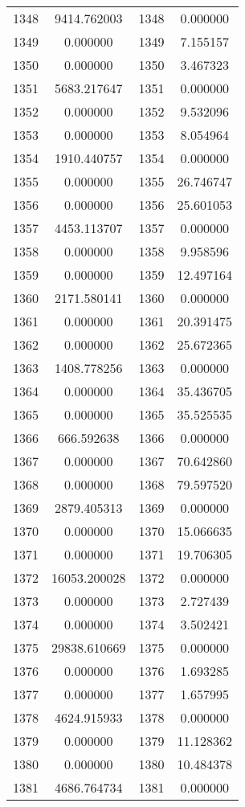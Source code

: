 \documentclass[12pt]{article}
\begin{document}
\begin{longtable}{@{}cccc@{}}
1348 & 9414.762003 & 1348 & 0.000000 \\
1349 & 0.000000 & 1349 & 7.155157 \\
1350 & 0.000000 & 1350 & 3.467323 \\
1351 & 5683.217647 & 1351 & 0.000000 \\
1352 & 0.000000 & 1352 & 9.532096 \\
1353 & 0.000000 & 1353 & 8.054964 \\
1354 & 1910.440757 & 1354 & 0.000000 \\
1355 & 0.000000 & 1355 & 26.746747 \\
1356 & 0.000000 & 1356 & 25.601053 \\
1357 & 4453.113707 & 1357 & 0.000000 \\
1358 & 0.000000 & 1358 & 9.958596 \\
1359 & 0.000000 & 1359 & 12.497164 \\
1360 & 2171.580141 & 1360 & 0.000000 \\
1361 & 0.000000 & 1361 & 20.391475 \\
1362 & 0.000000 & 1362 & 25.672365 \\
1363 & 1408.778256 & 1363 & 0.000000 \\
1364 & 0.000000 & 1364 & 35.436705 \\
1365 & 0.000000 & 1365 & 35.525535 \\
1366 & 666.592638 & 1366 & 0.000000 \\
1367 & 0.000000 & 1367 & 70.642860 \\
1368 & 0.000000 & 1368 & 79.597520 \\
1369 & 2879.405313 & 1369 & 0.000000 \\
1370 & 0.000000 & 1370 & 15.066635 \\
1371 & 0.000000 & 1371 & 19.706305 \\
1372 & 16053.200028 & 1372 & 0.000000 \\
1373 & 0.000000 & 1373 & 2.727439 \\
1374 & 0.000000 & 1374 & 3.502421 \\
1375 & 29838.610669 & 1375 & 0.000000 \\
1376 & 0.000000 & 1376 & 1.693285 \\
1377 & 0.000000 & 1377 & 1.657995 \\
1378 & 4624.915933 & 1378 & 0.000000 \\
1379 & 0.000000 & 1379 & 11.128362 \\
1380 & 0.000000 & 1380 & 10.484378 \\
1381 & 4686.764734 & 1381 & 0.000000 \\

\end{longtable}
\end{document}
